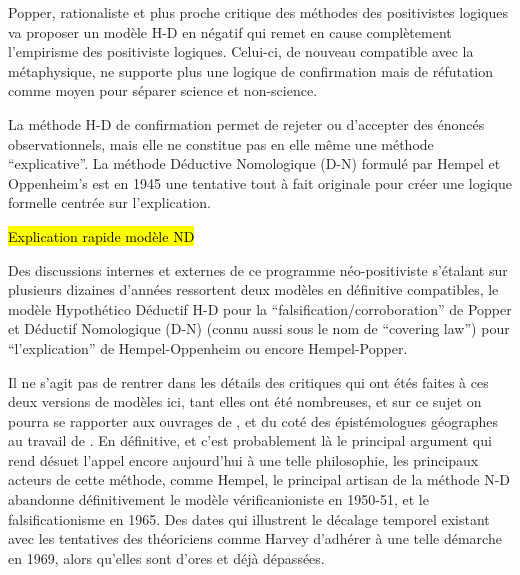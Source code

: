 Popper, rationaliste et plus proche critique des méthodes des positivistes logiques va proposer un modèle H-D en négatif qui remet en cause complètement l'empirisme des positiviste logiques. Celui-ci, de nouveau compatible avec la métaphysique, ne supporte plus une logique de confirmation mais de réfutation comme moyen pour séparer science et non-science.

La méthode H-D de confirmation permet de rejeter ou d'accepter des énoncés observationnels, mais elle ne constitue pas en elle même une méthode \enquote{explicative}. La méthode Déductive Nomologique (D-N) formulé par Hempel et Oppenheim’s  est en 1945 une tentative tout à fait originale pour créer une logique formelle centrée sur l'explication.

\hl{Explication rapide modèle ND}

Des discussions internes et externes de ce programme néo-positiviste s'étalant sur plusieurs dizaines d'années ressortent deux modèles en définitive compatibles, le modèle Hypothético Déductif H-D pour la \enquote{falsification/corroboration} de Popper et Déductif Nomologique (D-N) (connu aussi sous le nom de \foreignquote{english}{covering law}) pour \enquote{l'explication} de Hempel-Oppenheim ou encore Hempel-Popper.

Il ne s'agit pas de rentrer dans les détails des critiques qui ont étés faites à ces deux versions de modèles ici, tant elles ont été nombreuses, et sur ce sujet on pourra se rapporter aux ouvrages de \textcite{Chalmers1987}, \textcite[214-215]{Meyer1979} et du coté des épistémologues géographes au travail de \autocite{Besse2000}. En définitive, et c'est probablement là le principal argument qui rend désuet l'appel encore aujourd'hui à une telle philosophie, les principaux acteurs de cette méthode, comme Hempel, le principal artisan de la méthode N-D abandonne définitivement le modèle vérificanioniste en 1950-51, et le falsificationisme en 1965. Des dates qui illustrent le décalage temporel existant avec les tentatives des théoriciens comme Harvey d'adhérer à une telle démarche en 1969, alors qu'elles sont d'ores et déjà dépassées.


